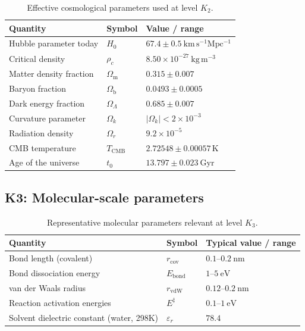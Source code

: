 \begin{table}[h]
  \centering
  \caption{Effective cosmological parameters used at level \(K_2\).}
  \label{tab:k2-cosmological-parameters}
  \begin{tabular}{lll}
    \hline
    Quantity & Symbol & Value / range \\
    \hline
    Hubble parameter today & \(H_0\)
        & \(67.4 \pm 0.5 ~ \mathrm{km\,s^{-1}Mpc^{-1}}\) \\
    Critical density       & \(\rho_c\)
        & \(8.50 \times 10^{-27} ~ \mathrm{kg\,m^{-3}}\) \\
    Matter density fraction & \(\Omega_\mathrm{m}\)
        & \(0.315 \pm 0.007\) \\
    Baryon fraction         & \(\Omega_\mathrm{b}\)
        & \(0.0493 \pm 0.0005\) \\
    Dark energy fraction    & \(\Omega_\Lambda\)
        & \(0.685 \pm 0.007\) \\
    Curvature parameter     & \(\Omega_k\)
        & \(|\Omega_k| < 2 \times 10^{-3}\) \\
    Radiation density       & \(\Omega_r\)
        & \(9.2 \times 10^{-5}\) \\
    CMB temperature         & \(T_\mathrm{CMB}\)
        & \(2.72548 \pm 0.00057 \,\mathrm{K}\) \\
    Age of the universe     & \(t_0\)
        & \(13.797 \pm 0.023 ~ \mathrm{Gyr}\) \\
    \hline
  \end{tabular}
\end{table}


\subsection*{K3: Molecular-scale parameters}

\begin{table}[h]
  \centering
  \caption{Representative molecular parameters relevant at level \(K_3\).}
  \label{tab:k3-molecular-parameters}
  \begin{tabular}{lll}
    \hline
    Quantity & Symbol & Typical value / range \\
    \hline
    Bond length (covalent) & \(r_\mathrm{cov}\)
        & \(0.1\text{–}0.2~\mathrm{nm}\) \\
    Bond dissociation energy & \(E_\mathrm{bond}\)
        & \(1\text{–}5~\mathrm{eV}\) \\
    van der Waals radius & \(r_\mathrm{vdW}\)
        & \(0.12\text{–}0.2~\mathrm{nm}\) \\
    Reaction activation energies & \(E^\ddagger\)
        & \(0.1\text{–}1~\mathrm{eV}\) \\
    Solvent dielectric constant (water, 298K)
        & \(\varepsilon_r\)
        & \(78.4\) \\
    \hline
  \end{tabular}
\end{table}

